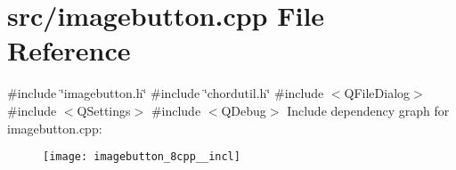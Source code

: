 \section{src/imagebutton.cpp File Reference}
\label{imagebutton_8cpp}
{\ttfamily \#include \char`\"{}imagebutton.\+h\char`\"{}}\newline
{\ttfamily \#include \char`\"{}chordutil.\+h\char`\"{}}\newline
{\ttfamily \#include $<$Q\+File\+Dialog$>$}\newline
{\ttfamily \#include $<$Q\+Settings$>$}\newline
{\ttfamily \#include $<$Q\+Debug$>$}\newline
Include dependency graph for imagebutton.\+cpp\+:\nopagebreak
\begin{figure}[H]
\begin{center}
\leavevmode
\texttt{[image: imagebutton\_8cpp\_\_incl]}
\end{center}
\end{figure}

